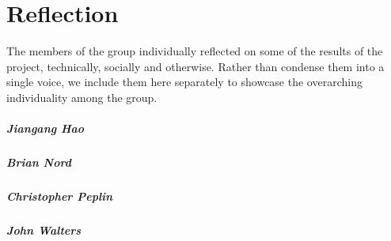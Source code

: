 \chapter{Reflection}
The members of the group individually reflected on some of the results of the project, technically, socially and otherwise.  Rather than condense them into a single voice, we include them here separately to showcase the overarching individuality among the group. 

\paragraph{Jiangang Hao}

\paragraph{Brian Nord}

\paragraph{Christopher Peplin}

\paragraph{John Walters}
